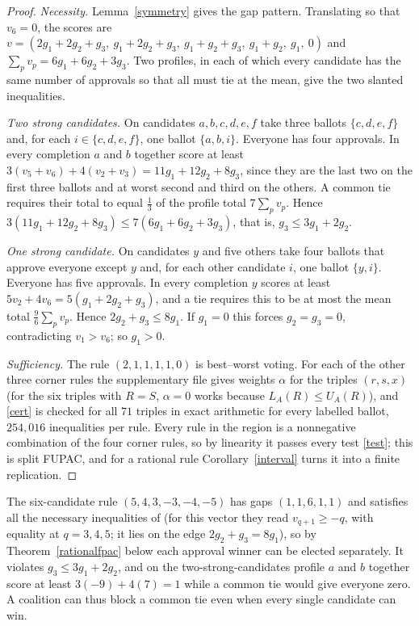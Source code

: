 \documentclass[11pt,a4paper]{article}
\theoremstyle{definition}
\theoremstyle{remark}
\begin{document}
\begin{proof}
\emph{Necessity.} Lemma~\ref{symmetry} gives the gap pattern. Translating so that $v_6=0$, the scores are $v=(2g_1+2g_2+g_3,\ g_1+2g_2+g_3,\ g_1+g_2+g_3,\ g_1+g_2,\ g_1,\ 0)$ and $\sum_pv_p=6g_1+6g_2+3g_3$. Two profiles, in each of which every candidate has the same number of approvals so that all must tie at the mean, give the two slanted inequalities.

\emph{Two strong candidates.} On candidates $a,b,c,d,e,f$ take three ballots $\{c,d,e,f\}$ and, for each $i\in\{c,d,e,f\}$, one ballot $\{a,b,i\}$. Everyone has four approvals. In every completion $a$ and $b$ together score at least $3(v_5+v_6)+4(v_2+v_3)=11g_1+12g_2+8g_3$, since they are the last two on the first three ballots and at worst second and third on the others. A common tie requires their total to equal $\tfrac13$ of the profile total $7\sum_pv_p$. Hence $3(11g_1+12g_2+8g_3)\le7(6g_1+6g_2+3g_3)$, that is, $g_3\le3g_1+2g_2$.

\emph{One strong candidate.} On candidates $y$ and five others take four ballots that approve everyone except $y$ and, for each other candidate $i$, one ballot $\{y,i\}$. Everyone has five approvals. In every completion $y$ scores at least $5v_2+4v_6=5(g_1+2g_2+g_3)$, and a tie requires this to be at most the mean total $\tfrac96\sum_pv_p$. Hence $2g_2+g_3\le8g_1$. If $g_1=0$ this forces $g_2=g_3=0$, contradicting $v_1>v_6$; so $g_1>0$.

\emph{Sufficiency.} The rule $(2,1,1,1,1,0)$ is best--worst voting. For each of the other three corner rules the supplementary file gives weights $\alpha$ for the triples $(r,s,x)$ (for the six triples with $R=S$, $\alpha=0$ works because $L_A(R)\le U_A(R)$), and \eqref{cert} is checked for all $71$ triples in exact arithmetic for every labelled ballot, $254{,}016$ inequalities per rule. Every rule in the region is a nonnegative combination of the four corner rules, so by linearity it passes every test \eqref{test}; this is split FUPAC, and for a rational rule Corollary~\ref{interval} turns it into a finite replication.
\end{proof}

The six-candidate rule $(5,4,3,-3,-4,-5)$ has gaps $(1,1,6,1,1)$ and satisfies all the necessary inequalities of \cite[Lemma~2]{tlz} (for this vector they read $v_{q+1}\ge-q$, with equality at $q=3,4,5$; it lies on the edge $2g_2+g_3=8g_1$), so by Theorem~\ref{rationalfpac} below each approval winner can be elected separately. It violates $g_3\le3g_1+2g_2$, and on the two-strong-candidates profile $a$ and $b$ together score at least $3(-9)+4(7)=1$ while a common tie would give everyone zero. A coalition can thus block a common tie even when every single candidate can win.
\end{document}
